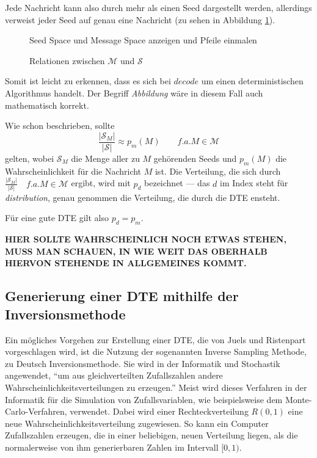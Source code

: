 Jede Nachricht kann also durch mehr als einen Seed dargestellt werden, allerdings verweist jeder Seed auf genau eine Nachricht (zu sehen in Abbildung \ref{fig:dte}).

\begin{figure}[!h]
Seed Space und Message Space anzeigen und Pfeile einmalen
\caption{Relationen zwischen $\mathcal{M}$ und $\mathcal{S}$}
\label{fig:dte}
\end{figure}

Somit ist leicht zu erkennen, dass es sich bei $decode$ um einen deterministischen Algorithmus handelt. Der Begriff \emph{Abbildung} wäre in diesem Fall auch mathematisch korrekt.

Wie schon beschrieben, sollte
$$\frac{|\mathcal{S}_M|}{|\mathcal{S}|} \approx p_m(M) \qquad f.a. M \in \mathcal{M}$$
gelten, wobei $\mathcal{S}_M$ die Menge aller zu $M$ gehörenden Seeds und $p_m(M)$ die Wahrscheinlichkeit für die Nachricht $M$ ist. Die Verteilung, die sich durch $\frac{|\mathcal{S}_M|}{|\mathcal{S}|} \quad f.a. M \in \mathcal{M}$ ergibt, wird mit $p_d$ bezeichnet --- das $d$ im Index steht für \emph{distribution}, genau genommen die Verteilung, die durch die DTE ensteht.

Für eine gute DTE gilt also $p_d = p_m$.

\textbf{HIER SOLLTE WAHRSCHEINLICH NOCH ETWAS STEHEN, MUSS MAN SCHAUEN, IN WIE WEIT DAS OBERHALB HIERVON STEHENDE IN ALLGEMEINES KOMMT.}

\subsection{Generierung einer DTE mithilfe der Inversionsmethode}

Ein mögliches Vorgehen zur Erstellung einer DTE, die von Juels und Ristenpart \cite{EURO2014} vorgeschlagen wird, ist die Nutzung der sogenannten Inverse Sampling Methode, zu Deutsch Inversionsmethode. Sie wird in der Informatik und Stochastik angewendet, ``um aus gleichverteilten Zufallszahlen andere Wahrscheinlichkeitsverteilungen zu erzeugen.'' \cite{WIKIInv} Meist wird dieses Verfahren in der Informatik für die Simulation von Zufallsvariablen, wie beispielsweise dem Monte-Carlo-Verfahren, verwendet. Dabei wird einer Rechteckverteilung $R(0,1)$ eine neue Wahrscheinlichkeitsverteilung zugewiesen. So kann ein Computer Zufallszahlen erzeugen, die in einer beliebigen, neuen Verteilung liegen, als die normalerweise von ihm generierbaren Zahlen im Intervall $[0,1)$.

